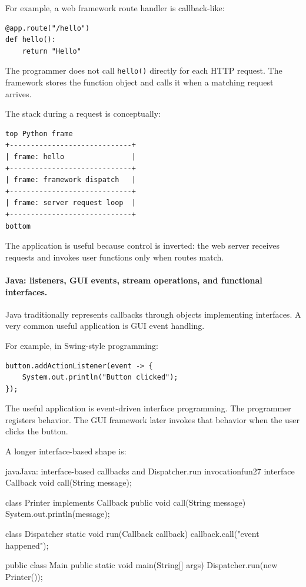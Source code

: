 For example, a web framework route handler is callback-like:

\begin{verbatim}
@app.route("/hello")
def hello():
    return "Hello"
\end{verbatim}

The programmer does not call \texttt{hello()} directly for each HTTP request. The framework stores the function object and calls it when a matching request arrives.

The stack during a request is conceptually:

\begin{verbatim}
top Python frame
+-----------------------------+
| frame: hello                |
+-----------------------------+
| frame: framework dispatch   |
+-----------------------------+
| frame: server request loop  |
+-----------------------------+
bottom
\end{verbatim}

The application is useful because control is inverted: the web server receives requests and invokes user functions only when routes match.

\paragraph{Java: listeners, GUI events, stream operations, and functional interfaces.}

Java traditionally represents callbacks through objects implementing interfaces. A very common useful application is GUI event handling.

For example, in Swing-style programming:

\begin{verbatim}
button.addActionListener(event -> {
    System.out.println("Button clicked");
});
\end{verbatim}

The useful application is event-driven interface programming. The programmer registers behavior. The GUI framework later invokes that behavior when the user clicks the button.

A longer interface-based shape is:

\begin{codebox}[]{java}{Java: interface-based callbacks and Dispatcher.run invocation}{fun27}
interface Callback {
    void call(String message);
}

class Printer implements Callback {
    public void call(String message) {
        System.out.println(message);
    }
}

class Dispatcher {
    static void run(Callback callback) {
        callback.call("event happened");
    }
}

public class Main {
    public static void main(String[] args) {
        Dispatcher.run(new Printer());
    }
}
\end{codebox}


